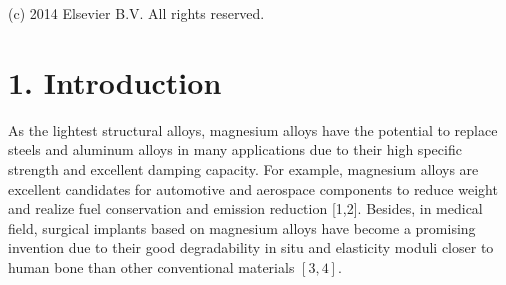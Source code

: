 \documentclass[10pt]{article}
\begin{document}
\begin{abstract}
A B S T R A C T Selective laser melting (SLM) technology has been used to manufacture the AZ91D magnesium alloy. The relative density, microstructure, microhardness and tensile properties of the deposited AZ91D samples at different laser energy inputs were characterized. The results indicate that laser energy input plays a significant role in determining formation qualities of the SLMed samples. High density samples without obvious macro-defects can be obtained between $83 \mathrm{~J} / \mathrm{mm}^{3}$ and $167 \mathrm{~J} / \mathrm{mm}^{3}$. The SLMed AZ91D presents a unique layerwise feature in which the fully divorced eutectic $\beta-\mathrm{Mg}_{17} \mathrm{Al}_{12}$ distributing along the boundary of the equiaxed $\alpha-\mathrm{Mg}$ matrix. The average size of $\alpha-\mathrm{Mg}$ in overlapping regions is a little larger than that in the center of the scanning tracks due to the remelting process though the element distributions of $\mathrm{Mg}$ and $\mathrm{Al}$ are quite uniform. The microhardness of all samples shows directional independence. The microhardness and tensile strengths of the SLMed AZ91D at room temperature are superior to those of the die-cast AZ91D due to the combined effect of grain refinement and solid solution strengthening.
\end{abstract}

(c) 2014 Elsevier B.V. All rights reserved.

\section*{1. Introduction}
As the lightest structural alloys, magnesium alloys have the potential to replace steels and aluminum alloys in many applications due to their high specific strength and excellent damping capacity. For example, magnesium alloys are excellent candidates for automotive and aerospace components to reduce weight and realize fuel conservation and emission reduction [1,2]. Besides, in medical field, surgical implants based on magnesium alloys have become a promising invention due to their good degradability in situ and elasticity moduli closer to human bone than other conventional materials $[3,4]$.
\end{document}
